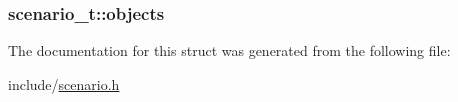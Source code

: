 \subsubsection[{\texorpdfstring{objects}{objects}}]{ scenario\+\_\+t\+::objects}\hypertarget{structscenario__t_ab01a8a6fa25d26374ff9b261e7512c1c}{}\label{structscenario__t_ab01a8a6fa25d26374ff9b261e7512c1c}


The documentation for this struct was generated from the following file\+:\begin{DoxyCompactItemize}
\item 
include/\hyperlink{scenario_8h}{scenario.\+h}\end{DoxyCompactItemize}
